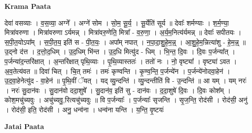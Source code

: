 \documentclass[17pt]{extarticle}
\begin{document}
\textbf{Krama Paata} \newline

देवा॑ वसव्याः । व॒स॒व्या॒ अग्ने᳚ । अग्ने॑ सोम । सो॒म॒ सू॒र्य॒ । सू॒र्येति॑ सूर्य ॥ देवाः᳚ शर्मण्याः । श॒र्म॒ण्या॒ मित्रा॑वरुणा । मित्रा॑वरुणा ऽर्यमन्न् । मित्रा॑वरु॒णेति॒ मित्रा᳚ - व॒रु॒णा॒ । अ॒र्य॒म॒नित्य॑र्यमन्न् ॥ देवाः᳚ सपीतयः । स॒पी॒त॒योऽपा᳚म् । स॒पी॒त॒य॒ इति॑ स - पी॒त॒यः॒ । अपा᳚म् नपात् । न॒पा॒दा॒शु॒हे॒म॒न्न्॒ । आ॒शु॒हे॒म॒न्नित्या॑शु - हे॒म॒न्न्॒ ॥ उ॒द्नो द॑त्त । द॒त्तो॒द॒धिम् । 
उ॒द॒धिम् भि॑न्त । उ॒द॒धि मित्यु॑द - धिम् । भि॒न्त॒ दि॒वः । दि॒वः प॒र्जन्या᳚त् । प॒र्जन्या॑द॒न्तरि॑क्षात् । अ॒न्तरि॑क्षात् पृथि॒व्याः । पृ॒थि॒व्यास्ततः॑ । ततो॑ नः । नो॒ वृष्ट्या᳚ । वृष्ट्या॑ ऽवत । अ॒व॒तेत्य॑वत ॥ दिवा॑ चित् । चि॒त् तमः॑ । तमः॑ कृण्वन्ति । कृ॒ण्व॒न्ति॒ प॒र्जन्ये॑न । प॒र्जन्ये॑नोदवा॒हेन॑ । उ॒द॒वा॒हेनेत्यु॑द - वा॒हेन॑ ॥ पृ॒थि॒वीं ॅयत् । यद् व्यु॒न्दन्ति॑ । व्यु॒न्दन्तीति॑ वि - उ॒न्दन्ति॑ ॥ आ यम् । यम् नरः॑ । नरः॑ सु॒दान॑वः । सु॒दान॑वो ददा॒शुषे᳚ । सु॒दान॑व॒ इति॑ सु - दान॑वः । द॒दा॒शुषे॑ दि॒वः । दि॒वः कोश᳚म् । कोश॒मचु॑च्यवुः । अचु॑च्यवु॒,रित्यचु॑च्यवुः ॥ वि प॒र्जन्याः᳚ । प॒र्जन्याः᳚ सृजन्ति । सृ॒ज॒न्ति॒ रोद॑सी । रोद॑सी॒ अनु॑ । रोद॑सी॒ इति॒ रोद॑सी । अनु॒ धन्व॑ना । धन्व॑ना यन्ति । य॒न्ति॒ वृ॒ष्टयः॑ \newline

\textbf{Jatai Paata} \newline
\end{document}
